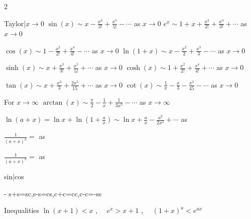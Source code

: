 \documentclass{note}
\begin{document}
\begin{multicols}{2}
{{\begin{MyTh}{Taylor|$x\to0$}
        \vspace{-2pt}
        \quad $\sin(x)\sim x - \frac{x^3}{3!} + \frac{x^5}{5!} - \cdots$ as $x\to0$ \quad $e^x \sim 1 + x + \frac{x^2}{2!} + \frac{x^3}{3!} + \cdots$ as $x\to0$

        \quad $\cos(x)\sim 1 - \frac{x^2}{2!} + \frac{x^4}{4!} - \cdots$ as $x\to0$ \quad $\ln(1+x) \sim x - \frac{x^2}{2} + \frac{x^3}{3} - \cdots$ as $x\to0$

        \quad $\sinh(x)\sim x + \frac{x^3}{3!} + \frac{x^5}{5!} + \cdots$ as $x\to0$ \quad $\cosh(x) \sim 1 + \frac{x^2}{2!} + \frac{x^4}{4!} + \cdots$ as $x\to0$
        
        \quad $\tan(x)\sim x + \frac{x^3}{3} + \frac{2x^5}{15} + \cdots$ as $x\to0$ \quad $\cot(x) \sim \frac{1}{x} - \frac{x}{3} - \frac{x^3}{45} - \cdots$ as $x\to0$
    \end{MyTh}

    \begin{MyTh}{For $x\to\infty$} \tiny
        $\arctan(x) \sim \frac{\pi}{2} - \frac{1}{x} + \frac{1}{3x^3} - \cdots$ as $x\to\infty$

        \vspace{-2pt}
        \quad $\ln(a+x) = \ln x + \ln(1+\frac{a}{x}) \sim \ln x + \frac{a}{x} - \frac{a^2}{2x^2} + \cdots$ as 

        \vspace{-2pt}
        \quad $\frac{1}{(a+x)^k} =$  as 
        
        \vspace{-3pt}
        \quad $\frac{1}{(a+x)^k} =$  as 
    \end{MyTh}

    \begin{MyTh}{sin|cos}

        -  \quad s+s=sc,s-s=cs,c+c=cc,c-c=-ss
    \end{MyTh}


    \begin{MyTh}{Inequalities}
        $\ln(x+1) < x$ , \ \ $e^x > x+1$ , \ \ $(1+x)^a < e^{ax}$
    \end{MyTh}

}}
\end{multicols}
\end{document}
